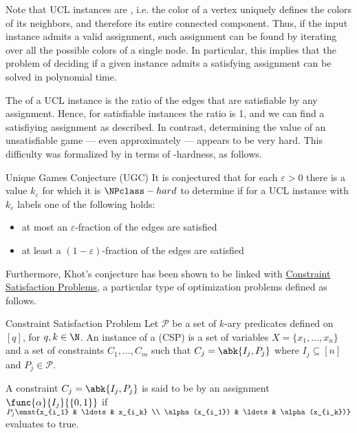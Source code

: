 \documentclass[a4paper, 12pt]{report}
\begin{document}

    Note that UCL instances are , i.e. the color of a vertex uniquely defines the colors of its neighbors, and therefore its entire connected component. Thus, if the input instance admits a valid assignment, such assignment can be found  by iterating over all the possible colors of a single node. In particular, this implies that the problem of deciding if a given instance admits a satisfying assignment can be solved in polynomial time.

    The  of a UCL instance is the ratio of the edges that are satisfiable by any assignment. Hence, for satisfiable instances the ratio is 1, and we can find a satisfiying assignment as described. In contrast, determining the value of an unsatisfiable game --- even approximately --- appears to be very hard. This difficulty was formalized by \textcite{khot} in terms of \NPclass-hardness, as follows.

    \begin{framedconj}{Unique Games Conjecture (UGC)}
        It is conjectured that for each $\varepsilon > 0$ there is a value $k_\varepsilon$ for which it is $\NPclass-hard$ to determine if for a UCL instance with $k_\varepsilon$ labels one of the following holds:

        \begin{itemize}
            \item at most an $\varepsilon$-fraction of the edges are satisfied
            \item at least a $(1 - \varepsilon)$-fraction of the edges are satisfied
        \end{itemize}
    \end{framedconj}

    Furthermore, Khot's conjecture has been shown to be linked with \href{https://en.wikipedia.org/wiki/Constraint_satisfaction_problem}{Constraint Satisfaction Problems}, a particular type of optimization problems defined as follows.

    \begin{frameddefn}{Constraint Satisfaction Problem}
        Let $\mathcal P$ be a set of $k$-ary predicates defined on $[q]$, for $q, k \in \N$. An instance of a  (CSP) is a set of variables $X = \{x_1, \ldots, x_n\}$ and a set of constraints $C_1, \ldots, C_m$ such that $C_j = \abk{I_j, P_j}$ where $I_j \subseteq [n]$ and $P_j \in \mathcal P$.

        A constraint $C_j = \abk{I_j, P_j}$ is said to be  by an assignment $\func{\alpha}{I_j}{\{0, 1\}}$ if $P_j \smat{x_{i_1} & \ldots & x_{i_k} \\ \alpha(x_{i_1}) & \ldots & \alpha(x_{i_k})}$ evaluates to true.
    \end{frameddefn}
\end{document}
